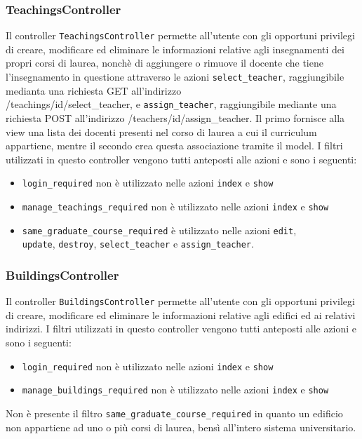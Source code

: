 \documentclass[11pt,a4paper]{article}
\begin{document}
\subsubsection{TeachingsController}
Il controller \verb|TeachingsController| permette all'utente con gli opportuni privilegi di creare, modificare ed eliminare le informazioni relative agli insegnamenti dei propri corsi di laurea, nonchè di aggiungere o rimuove il docente che tiene l'insegnamento in questione attraverso le azioni \verb|select_teacher|, raggiungibile medianta una richiesta GET all'indirizzo \\ /teachings/id/select\_teacher, e \verb|assign_teacher|, raggiungibile mediante una richiesta POST all'indirizzo /teachers/id/assign\_teacher. Il primo fornisce alla view una lista dei docenti presenti nel corso di laurea a cui il curriculum appartiene, mentre il secondo crea questa associazione tramite il model.
I filtri utilizzati in questo controller vengono tutti anteposti alle azioni e sono i seguenti:
\begin{itemize}
 \item \verb|login_required| non è utilizzato nelle azioni \verb|index| e \verb|show|
 \item \verb|manage_teachings_required| non è utilizzato nelle azioni \verb|index| e \verb|show|
 \item \verb|same_graduate_course_required| è utilizzato nelle azioni \verb|edit|,\\ \verb|update|, \verb|destroy|, \verb|select_teacher| e \verb|assign_teacher|.
\end{itemize}
\subsubsection{BuildingsController}
Il controller \verb|BuildingsController| permette all'utente con gli opportuni privilegi di creare, modificare ed eliminare le informazioni relative agli edifici ed ai relativi indirizzi.
I filtri utilizzati in questo controller vengono tutti anteposti alle azioni e sono i seguenti:
\begin{itemize}
 \item \verb|login_required| non è utilizzato nelle azioni \verb|index| e \verb|show|
 \item \verb|manage_buildings_required| non è utilizzato nelle azioni \verb|index| e \verb|show|
\end{itemize}
Non è presente il filtro \verb|same_graduate_course_required| in quanto un edificio non appartiene ad uno o più corsi di laurea, bensì all'intero sistema universitario.
\end{document}
